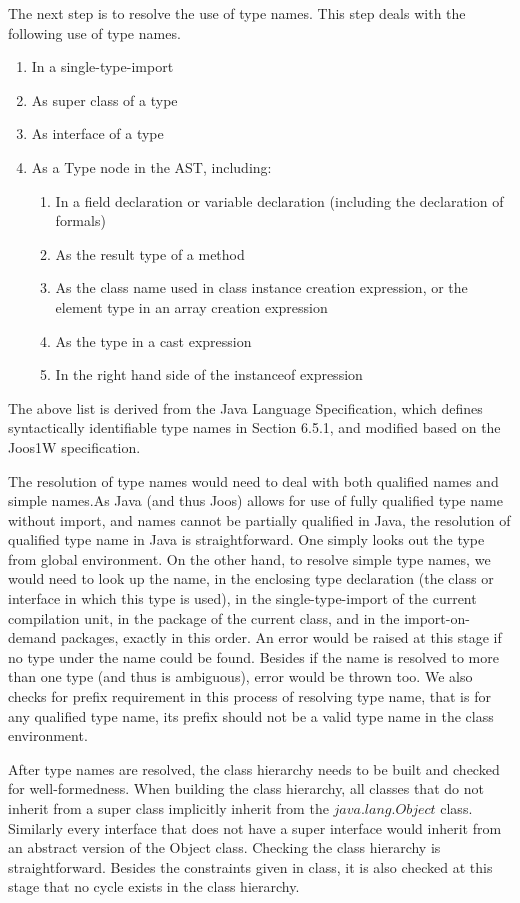\documentclass[a4paper, notitlepage]{report}
\begin{document}
The next step is to resolve the use of type names. This step deals with the following use of type names.
\begin{enumerate}
\item In a single-type-import
\item As super class of a type
\item As interface of a type
\item As a Type node in the AST, including:
	\begin{enumerate}
	\item In a field declaration or variable declaration (including the declaration of formals)
	\item As the result type of a method
	\item As the class name used in class instance creation expression, or the element type in an array creation expression
	\item As the type in a cast expression
	\item In the right hand side of the instanceof expression
	\end{enumerate}
\end{enumerate}
The above list is derived from the Java Language Specification, which defines syntactically identifiable type names in Section 6.5.1, and modified based on the Joos1W specification. 

The resolution of type names would need to deal with both qualified names and simple names.As Java (and thus Joos) allows for use of fully qualified type name without import, and names cannot be partially qualified in Java, the resolution of qualified type name in Java is straightforward. One simply looks out the type from global environment. On the other hand, to resolve simple type names, we would need to look up the name, in the enclosing type declaration (the class or interface in which this type is used), in the single-type-import of the current compilation unit, in the package of the current class, and in the import-on-demand packages, exactly in this order. An error would be raised at this stage if no type under the name could be found. Besides if the name is resolved to more than one type (and thus is ambiguous), error would be thrown too. We also checks for prefix requirement in this process of resolving type name, that is for any qualified type name, its prefix should not be a valid type name in the class environment.

After type names are resolved, the class hierarchy needs to be built and checked for well-formedness. When building the class hierarchy, all classes that do not inherit from a super class implicitly inherit from the $java.lang.Object$ class. Similarly every interface that does not have a super interface would inherit from an abstract version of the Object class. Checking the class hierarchy is straightforward. Besides the constraints given in class, it is also checked at this stage that no cycle exists in the class hierarchy.
\end{document}
